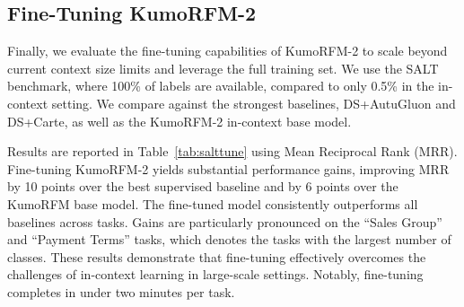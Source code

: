 \documentclass{article}
\newcommand{\twozero}{2\xspace}
\newcommand{\name}{KumoRFM\xspace}
\newcommand{\nametwo}{\name-\twozero}
\begin{document}
\subsection{Fine-Tuning \nametwo}
\label{subsec:finetuning}

Finally, we evaluate the fine-tuning capabilities of \nametwo to scale beyond current context size limits and leverage the full training set.
We use the SALT benchmark, where 100\% of labels are available, compared to only 0.5\% in the in-context setting.
We compare against the strongest baselines, DS+AutuGluon and DS+Carte, as well as the \nametwo in-context base model.

Results are reported in Table~\ref{tab:salttune} using Mean Reciprocal Rank (MRR).
Fine-tuning \nametwo yields substantial performance gains, improving MRR by 10 points over the best supervised baseline and by 6 points over the \name base model.
The fine-tuned model consistently outperforms all baselines across tasks.
Gains are particularly pronounced on the ``Sales Group'' and ``Payment Terms'' tasks, which denotes the tasks with the largest number of classes.
These results demonstrate that fine-tuning effectively overcomes the challenges of in-context learning in large-scale settings.
Notably, fine-tuning completes in under two minutes per task.
\end{document}
